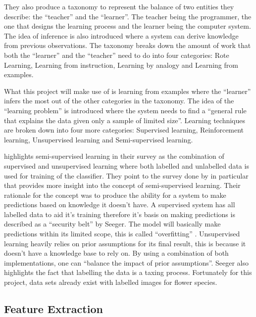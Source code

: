 \documentclass[12pt,a4paper]{report}
\begin{document}
They also produce a taxonomy to represent the balance of two entities they describe: the “teacher” and the “learner”. 
The teacher being the programmer, the one that designs the learning process and the learner being the computer system. 
The idea of inference is also introduced where a system can derive knowledge from previous observations. The taxonomy 
breaks down the amount of work that both the “learner” and the “teacher” need to do into four categories: Rote Learning,
Learning from instruction, Learning by analogy and Learning from examples.

\par

What this project will make use of is learning from examples where the “learner” infers the most out of the other 
categories in the taxonomy. The idea of the “learning problem” is introduced where the system needs to find a “general 
rule that explains the data given only a sample of limited size”. Learning techniques are broken down into four more 
categories: Supervised learning, Reinforcement learning, Unsupervised learning and Semi-supervised learning.

\par

\citet{zhu2005semi} highlights semi-supervised learning in their survey as the combination of supervised and
unsupervised 
learning where both labelled and unlabelled data is used for training of the classifier. They point to the survey done by
\citet{seeger2000learning} in particular that provides more insight into the concept of semi-supervised 
learning. Their rationale for the concept was to produce the ability for a system to make predictions based on 
knowledge it doesn't have. A supervised system has all labelled data to aid it's training therefore it's basis on making
predictions is described as a “security belt” by Seeger. The model will basically make predictions within its limited 
scope, this is called “overfitting” \citep{tom1995}. Unsupervised learning heavily relies on prior assumptions for 
its final result, this is because it doesn't have a knowledge base to rely on. By using a combination of both 
implementations, one can “balance the impact of prior assumptions”. Seeger also highlights the fact that labelling the 
data is a taxing process. Fortunately for this project, data sets already exist with labelled images for 
flower species.

\subsection{Feature Extraction}
\end{document}
